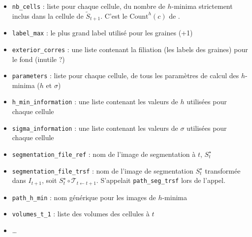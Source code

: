 \documentclass{article}
\begin{document}
\begin{itemize}
\item \verb|nb_cells| : liste pour chaque cellule, du nombre de $h$-minima strictement inclus dans la cellule de  $\tilde{S}_{t+1}$. C'est le $\mathrm{Count}^{h}(c)$ de \cite[section 2.3.3.5, page 71]{guignard:tel-01278725}.
\item \verb|label_max| :  le plus grand label utilisé pour les graines (+1)
\item \verb|exterior_corres| : une liste contenant la filiation (les labels des graines) pour le fond (inutile ?)
\item \verb|parameters| : liste pour chaque cellule,  de tous les param\`etres de calcul des $h$-minima ($h$ et $\sigma$)
\item \verb|h_min_information| : une liste contenant les valeurs de $h$ utilisées pour chaque cellule
\item \verb|sigma_information| : une liste contenant les valeurs de $\sigma$ utilisées pour chaque cellule
\item \verb|segmentation_file_ref| : nom de l'image de segmentation \`a $t$, $S^{\star}_t$
\item \verb|segmentation_file_trsf| : nom de l'image de segmentation $S^{\star}_t$ transform\'ee dans $I_{t+1}$, soit
$S^{\star}_t \circ \mathcal{T}_{t \leftarrow t+1}$. S'appelait \verb|path_seg_trsf| lors de l'appel.
\item \verb|path_h_min| : nom g\'en\'erique pour les images de $h$-minima
\item \verb|volumes_t_1| : liste des volumes des cellules \`a $t$
\item \ldots
\end{itemize}
\color{black}
\end{document}
